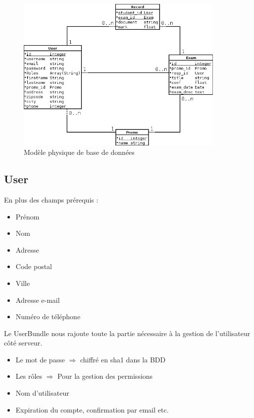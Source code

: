 \documentclass{report}
\begin{document}
    \begin{figure}
      \includegraphics[width=0.9\textwidth]{./db.png}
      \caption{Modèle physique de base de données}
    \end{figure}

    \subsection{User}
      En plus des champs prérequis :
      \begin{itemize}
        \item{Prénom}
        \item{Nom}
        \item{Adresse}
        \item{Code postal}
        \item{Ville}
        \item{Adresse e-mail}
        \item{Numéro de téléphone}
      \end{itemize}

      Le UserBundle nous rajoute toute la partie nécessaire à la gestion de
      l'utilisateur côté serveur.
      \begin{itemize}
        \item{Le mot de passe $\Rightarrow$ chiffré en sha1 dans la BDD}
        \item{Les rôles $\Rightarrow$ Pour la gestion des permissions}
        \item{Nom d'utilisateur}
        \item{Expiration du compte, confirmation par email etc.}
      \end{itemize}
\end{document}
